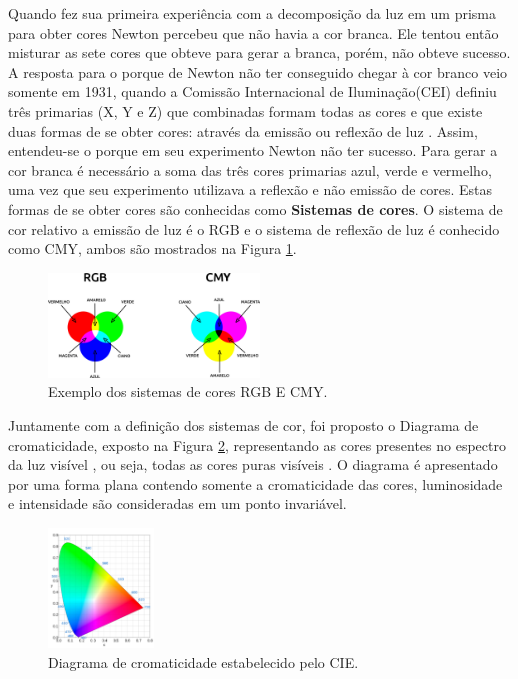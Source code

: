 Quando fez sua primeira experiência com a decomposição da luz em um prisma para obter cores Newton percebeu que não havia a cor branca. Ele tentou então misturar as sete cores que obteve para gerar a branca, porém, não obteve sucesso.
A resposta para o porque de Newton não ter conseguido chegar à cor branco veio somente em 1931, quando a Comissão Internacional de Iluminação(CEI) definiu três primarias (X, Y e Z) que combinadas formam todas as cores e que existe duas formas de se obter cores: através da emissão ou reflexão de luz \cite{Souto:2003}. Assim, entendeu-se o porque em seu experimento Newton não ter sucesso. Para gerar a cor branca é necessário a soma das três cores primarias azul, verde e vermelho, uma vez que seu experimento utilizava a reflexão e não emissão de cores.
Estas formas de se obter cores são conhecidas como \textbf{Sistemas de cores}. O sistema de cor relativo a emissão de luz é o RGB e o sistema de reflexão de luz é conhecido como CMY, ambos são mostrados na Figura \ref{fig:sistemasdecores}.
 \begin{figure}[H]
 	\centering
 	\includegraphics[width=0.5\textwidth]{espacos.pdf}
 	\caption{Exemplo dos sistemas de cores RGB E CMY.}
 	\label{fig:sistemasdecores}
 \end{figure}

Juntamente com a definição dos sistemas de cor, foi proposto o Diagrama de cromaticidade, exposto na Figura \ref{fig:DiagramadeCores}, representando as cores presentes no espectro da luz visível \cite{Souto:2003}, ou seja, todas as cores puras visíveis . O diagrama é apresentado por uma forma plana contendo somente a cromaticidade das cores, luminosidade e intensidade são consideradas em um ponto invariável.
 
 
 \begin{figure}[H]
 	\centering
 	\includegraphics[width=0.25\textwidth]{graficocie.pdf}
 	\caption{Diagrama de cromaticidade estabelecido pelo CIE.}
 	\label{fig:DiagramadeCores}
 \end{figure}

